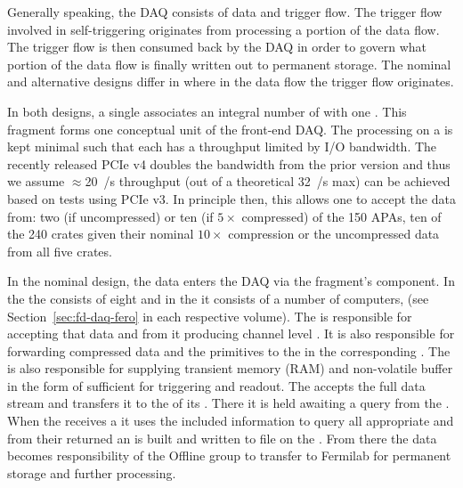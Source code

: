 Generally speaking, the DAQ consists of data and trigger flow.
The trigger flow involved in self-triggering originates from
processing a portion of the data flow. 
The trigger flow is then consumed back by the DAQ in order to govern
what portion of the data flow is finally written out to permanent
storage. 
The nominal and alternative designs differ in where in the data flow
the trigger flow originates. 

In both designs, a single  associates an integral
number of  with one .
This fragment forms one conceptual unit of the front-end DAQ.
The processing on a  is kept minimal such that each has a
throughput limited by I/O bandwidth. 
The recently released PCIe v4 doubles the bandwidth from the prior
version and thus we assume $\approx$\SI{20}{\GB/\s} throughput (out of
a theoretical \SI{32}{\GB/\s} max) can be achieved based on tests
using PCIe v3.
In principle then, this allows one  to accept the data
from: two (if uncompressed) or ten (if $5\times$ compressed) of the
150  APAs, ten of the 240   crates
given their nominal $10\times$ compression or the uncompressed data
from all five   crates.

In the nominal design, the data enters the DAQ via the fragment's
 component.
In the  the  consists of eight 
and in the  it consists of a number of 
computers, (see Section~\ref{sec:fd-daq-fero} in each respective  volume).
The  is responsible for accepting that data and from it
producing channel level .
It is also responsible for forwarding compressed data and the
primitives to the  in the corresponding .
The  is also responsible for supplying transient memory
(RAM) and non-volatile buffer in the form of  sufficient
for  triggering and readout.
The  accepts the full data stream and transfers it to the
 of its . 
There it is held awaiting a query from the . 
When the  receives a  it uses the
included information to query all appropriate  and from
their returned  an  is built and
written to file on the . 
From there the data becomes responsibility of the Offline group to
transfer to Fermilab for permanent storage and further processing.

